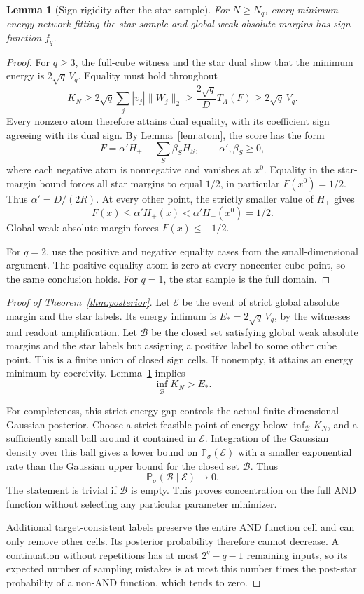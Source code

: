 \documentclass[11pt]{article}
\newtheorem{lemma}[theorem]{Lemma}
\newcommand{\Pp}{\mathbb P}
\newcommand{\norm}[1]{\lVert #1\rVert}
\begin{document}
\begin{lemma}[Sign rigidity after the star sample]\label{lem:rigidity}
For $N\ge N_q$, every minimum-energy network fitting the star
sample and global weak absolute margins has sign function $f_q$.
\end{lemma}
\begin{proof}
For $q\ge3$, the full-cube witness and the star dual show that the
minimum energy is $2\sqrt q\,V_q$. Equality must hold throughout
\[
 K_N\ge2\sqrt q\sum_j|v_j|\norm{W_j}_2
       \ge\frac{2\sqrt q}D T_A(F)
       \ge2\sqrt q\,V_q.
\]
Every nonzero atom therefore attains dual equality, with its
coefficient sign agreeing with its dual sign. By
Lemma~\ref{lem:atom}, the score has the form
\[
 F=\alpha' H_+-\sum_S\beta_S H_S,
 \qquad \alpha',\beta_S\ge0,
\]
where each negative atom is nonnegative and vanishes at $x^0$.
Equality in the star-margin bound forces all star margins to equal
$1/2$, in particular $F(x^0)=1/2$. Thus $\alpha'=D/(2R)$.
At every other point, the strictly smaller value of $H_+$ gives
\[
 F(x)\le\alpha'H_+(x)<\alpha'H_+(x^0)=1/2.
\]
Global weak absolute margin forces $F(x)\le-1/2$.

For $q=2$, use the positive and negative equality cases from the
small-dimensional argument. The positive equality atom is zero
at every noncenter cube point, so the same conclusion holds.
For $q=1$, the star sample is the full domain.
\end{proof}

\begin{proof}[Proof of Theorem~\ref{thm:posterior}]
Let $\mathcal E$ be the event of strict global absolute margin
and the star labels. Its energy infimum is $E_*=2\sqrt q\,V_q$,
by the witnesses and readout amplification. Let $\mathcal B$ be
the closed set satisfying global weak absolute margins and the
star labels but assigning a positive label to some other cube
point. This is a finite union of closed sign cells. If nonempty,
it attains an energy minimum by coercivity. Lemma~\ref{lem:rigidity}
implies
\[
 \inf_{\mathcal B}K_N>E_*.
\]

For completeness, this strict energy gap controls the actual
finite-dimensional Gaussian posterior. Choose a strict feasible
point of energy below $\inf_{\mathcal B}K_N$, and a sufficiently
small ball around it contained in $\mathcal E$. Integration of
the Gaussian density over this ball gives a lower bound on
$\Pp_\sigma(\mathcal E)$ with a smaller exponential rate than the
Gaussian upper bound for the closed set $\mathcal B$. Thus
\[
 \Pp_\sigma(\mathcal B\mid\mathcal E)\longrightarrow0.
\]
The statement is trivial if $\mathcal B$ is empty. This proves
concentration on the full AND function without selecting any
particular parameter minimizer.

Additional target-consistent labels preserve the entire AND
function cell and can only remove other cells. Its posterior
probability therefore cannot decrease. A continuation without
repetitions has at most $2^q-q-1$ remaining inputs, so its expected
number of sampling mistakes is at most this number times the
post-star probability of a non-AND function, which tends to zero.
\end{proof}
\end{document}
